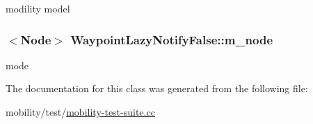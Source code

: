 modility model 

\subsubsection[{\texorpdfstring{m\+\_\+node}{m_node}}]{$<${\bf Node}$>$ Waypoint\+Lazy\+Notify\+False\+::m\+\_\+node\hspace{0.3cm}{\ttfamily [private]}}\hypertarget{classWaypointLazyNotifyFalse_a979dbe1c5694a1983f588550429d2159}{}\label{classWaypointLazyNotifyFalse_a979dbe1c5694a1983f588550429d2159}


mode 



The documentation for this class was generated from the following file\+:\begin{DoxyCompactItemize}
\item 
mobility/test/\hyperlink{mobility-test-suite_8cc}{mobility-\/test-\/suite.\+cc}\end{DoxyCompactItemize}
